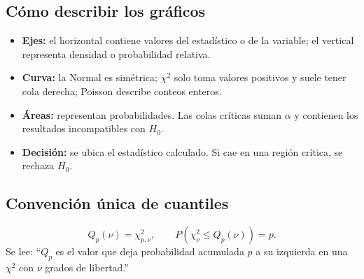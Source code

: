 \documentclass[11pt,a4paper]{article}
\begin{document}
\subsection{Cómo describir los gráficos}
\begin{itemize}
\item \textbf{Ejes:} el horizontal contiene valores del estadístico o de la variable; el vertical representa densidad o probabilidad relativa.
\item \textbf{Curva:} la Normal es simétrica; $\chi^2$ solo toma valores positivos y suele tener cola derecha; Poisson describe conteos enteros.
\item \textbf{Áreas:} representan probabilidades. Las colas críticas suman $\alpha$ y contienen los resultados incompatibles con $H_0$.
\item \textbf{Decisión:} se ubica el estadístico calculado. Si cae en una región crítica, se rechaza $H_0$.
\end{itemize}

\begin{center}
\end{center}

\subsection{Convención única de cuantiles}
\[
Q_p(\nu)=\chi^2_{p,\nu},\qquad P(\chi^2_\nu\le Q_p(\nu))=p.
\]
Se lee: ``$Q_p$ es el valor que deja probabilidad acumulada $p$ a su izquierda en una $\chi^2$ con $\nu$ grados de libertad.''
\end{document}
